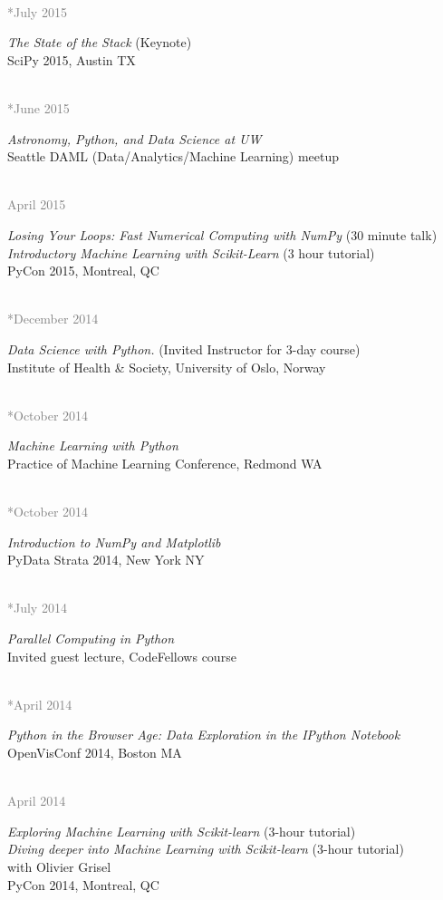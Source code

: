 \documentclass{article} %
\newlength\sidebarwidth
\newcommand{\dateonly}[2][]
	 {\begin{minipage}{\textwidth}
	 \vspace*{.4\baselineskip}
         \nopagebreak\hspace{0in}%
         \nopagebreak\begin{minipage}[t]{\sidebarwidth - .2cm}
         \raggedleft {~}
         {\\[-\baselineskip] \textcolor{gray}{\footnotesize #1}}
	 \end{minipage}%
	 \hfill
	 \begin{minipage}[t]{\linewidth - \sidebarwidth}
	 #2%
	 \end{minipage}%
	 \vspace*{.2\baselineskip plus 1\baselineskip minus
	 .2\baselineskip}%
	 \end{minipage}}
\begin{document}
  \dateonly[**July 2015]{
    {\it The State of the Stack} (Keynote)\\
    SciPy 2015, Austin TX
  }

  \dateonly[**June 2015]{
    {\it Astronomy, Python, and Data Science at UW}\\
    Seattle DAML (Data/Analytics/Machine Learning) meetup
  }

  \dateonly[April 2015]{
    {\it Losing Your Loops: Fast Numerical Computing with NumPy} (30 minute talk)\\
    {\it Introductory Machine Learning with Scikit-Learn} (3 hour tutorial)\\
    PyCon 2015, Montreal, QC
  }

  \dateonly[**December 2014]{
    {\it Data Science with Python.} (Invited Instructor for 3-day course)\\
    Institute of Health \& Society, University of Oslo, Norway
  }

  \dateonly[**October 2014]{
    {\it Machine Learning with Python}\\
    Practice of Machine Learning Conference, Redmond WA
  }

  \dateonly[**October 2014]{
    {\it Introduction to NumPy and Matplotlib}\\
    PyData \@ Strata 2014, New York NY
  }

  \dateonly[**July 2014]{
    {\it Parallel Computing in Python}\\
    Invited guest lecture, CodeFellows course
  }

  \dateonly[**April 2014]{
    {\it Python in the Browser Age: Data Exploration in the IPython Notebook}\\
    OpenVisConf 2014, Boston MA
  }

  \dateonly[April 2014]{
    {\it Exploring Machine Learning with Scikit-learn} (3-hour tutorial)\\
    {\it Diving deeper into Machine Learning with Scikit-learn} (3-hour tutorial)\\
    with Olivier Grisel\\
    PyCon 2014, Montreal, QC
  }
\end{document}
